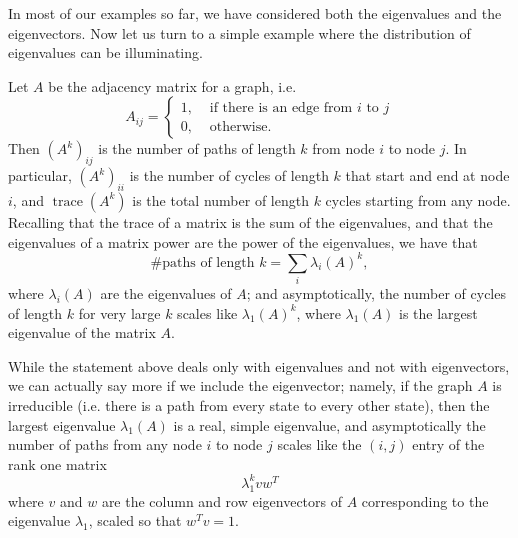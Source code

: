 In most of our examples so far, we have considered both the
eigenvalues and the eigenvectors.  Now let us turn to a simple example
where the distribution of eigenvalues can be illuminating.

Let $A$ be the adjacency matrix for a graph, i.e.
\[
  A_{ij} = \begin{cases}
    1, & \mbox{ if there is an edge from $i$ to $j$} \\
    0, & \mbox{ otherwise}.
  \end{cases}
\]
Then $(A^k)_{ij}$ is the number of paths of length $k$ from node $i$
to node $j$.  In particular, $(A^k)_{ii}$ is the number of cycles of
length $k$ that start and end at node $i$, and
$\operatorname{trace}(A^k)$ is the total number of length $k$ cycles
starting from any node.  Recalling that the trace of a matrix is the
sum of the eigenvalues, and that the eigenvalues of a matrix power are
the power of the eigenvalues, we have that
\[
  \mbox{\# paths of length $k$} = \sum_{i} \lambda_i(A)^k,
\]
where $\lambda_i(A)$ are the eigenvalues of $A$; and asymptotically,
the number of cycles of length $k$ for very large $k$ scales like
$\lambda_1(A)^k$, where $\lambda_1(A)$ is the largest eigenvalue of
the matrix $A$.

While the statement above deals only with eigenvalues and not with
eigenvectors, we can actually say more if we include the eigenvector;
namely, if the graph $A$ is irreducible (i.e. there is a path from
every state to every other state), then the largest eigenvalue
$\lambda_1(A)$ is a real, simple eigenvalue, and asymptotically the number
of paths from any node $i$ to node $j$ scales like the $(i,j)$ entry
of the rank one matrix
\[
  \lambda_1^k v w^T
\]
where $v$ and $w$ are the column and row eigenvectors of $A$
corresponding to the eigenvalue $\lambda_1$, scaled so that $w^T v = 1$.
